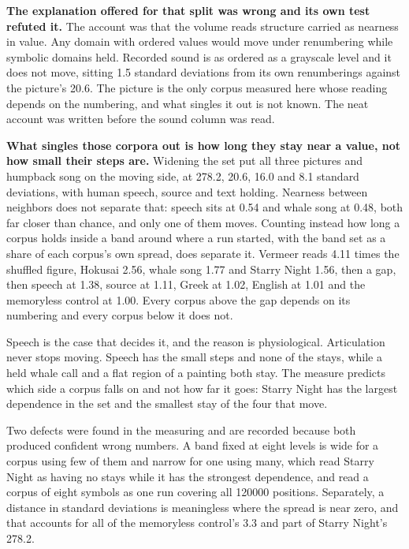 \textbf{The explanation offered for that split was wrong and its own test refuted it.} The account was that the volume reads structure carried as nearness in value. Any domain with ordered values would move under renumbering while symbolic domains held. Recorded sound is as ordered as a grayscale level and it does not move, sitting 1.5 standard deviations from its own renumberings against the picture's 20.6. The picture is the only corpus measured here whose reading depends on the numbering, and what singles it out is not known. The neat account was written before the sound column was read.

\textbf{What singles those corpora out is how long they stay near a value, not how small their steps are.} Widening the set put all three pictures and humpback song on the moving side, at 278.2, 20.6, 16.0 and 8.1 standard deviations, with human speech, source and text holding. Nearness between neighbors does not separate that: speech sits at 0.54 and whale song at 0.48, both far closer than chance, and only one of them moves. Counting instead how long a corpus holds inside a band around where a run started, with the band set as a share of each corpus's own spread, does separate it. Vermeer reads 4.11 times the shuffled figure, Hokusai 2.56, whale song 1.77 and Starry Night 1.56, then a gap, then speech at 1.38, source at 1.11, Greek at 1.02, English at 1.01 and the memoryless control at 1.00. Every corpus above the gap depends on its numbering and every corpus below it does not.

Speech is the case that decides it, and the reason is physiological. Articulation never stops moving. Speech has the small steps and none of the stays, while a held whale call and a flat region of a painting both stay. The measure predicts which side a corpus falls on and not how far it goes: Starry Night has the largest dependence in the set and the smallest stay of the four that move.

Two defects were found in the measuring and are recorded because both produced confident wrong numbers. A band fixed at eight levels is wide for a corpus using few of them and narrow for one using many, which read Starry Night as having no stays while it has the strongest dependence, and read a corpus of eight symbols as one run covering all 120000 positions. Separately, a distance in standard deviations is meaningless where the spread is near zero, and that accounts for all of the memoryless control's 3.3 and part of Starry Night's 278.2.

